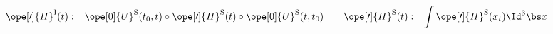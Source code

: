 \begin{equation}	\label{12.91}
\ope[\prime]{H}^{\mathrm{I}}(t)
:=
\ope[0]{U}^{\mathrm{S}}(t_0,t)
\circ \ope[\prime]{H}^{\mathrm{S}}(t) \circ
\ope[0]{U}^{\mathrm{S}}(t,t_0)
\qquad
\ope[\prime]{H}^{\mathrm{S}}(t)
:=
\int \ope[\prime]{H}^{\mathrm{S}}(x_t) \Id^3\bs x
	\end{equation}

